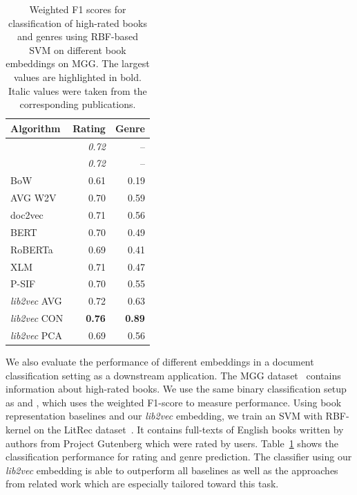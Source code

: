\documentclass[11pt]{article}
\begin{document}
\begin{table}
	\centering 
	\begin{tabular}{lrr}
		\toprule
		Algorithm                        &        Rating &         Genre \\ \midrule
		\citet{maharjan_multi-task_2017} & \textit{0.72} &            -- \\
		\citet{khalifa_will_2020}        & \textit{0.72} &            -- \\ \midrule
		BoW                              &          0.61 &          0.19 \\
		AVG W2V                          &          0.70 &          0.59 \\
		doc2vec                          &          0.71 &          0.56 \\
		BERT                             &          0.70 &          0.49 \\
		RoBERTa                          &          0.69 &          0.41 \\
		XLM                              &          0.71 &          0.47 \\
		P-SIF                            &          0.70 &          0.55 \\
		\emph{lib2vec} AVG               &          0.72 &          0.63 \\ 
		\emph{lib2vec} CON               & \textbf{0.76} & \textbf{0.89} \\
		\emph{lib2vec} PCA               &          0.69 &          0.56 \\ \bottomrule
	\end{tabular}
	\caption{Weighted F1 scores for classification of high-rated books and genres using RBF-based SVM on different book embeddings on MGG. The largest values are highlighted in bold. Italic values were taken from the corresponding publications.}
	\label{tab:down_stream_eval_f1}
\end{table}

We also evaluate the performance of different embeddings in a document classification setting as a downstream application.
The MGG dataset~\citep{maharjan_multi-task_2017} contains information about high-rated books.
We use the same binary classification setup as \citep{maharjan_multi-task_2017} and \citep{khalifa_will_2020}, which uses the weighted F1-score to measure performance.
Using book representation baselines and our \emph{lib2vec} embedding, we train an SVM with RBF-kernel on the LitRec dataset~\citep{vaz_litrec_2012}.
It contains  full-texts of English books written by  authors from Project Gutenberg which were rated by  users.
Table~\ref{tab:down_stream_eval_f1} shows the classification performance for rating and genre prediction.
The classifier using our \emph{lib2vec} embedding is able to outperform all baselines as well as the approaches from related work which are especially tailored toward this task.
\end{document}
